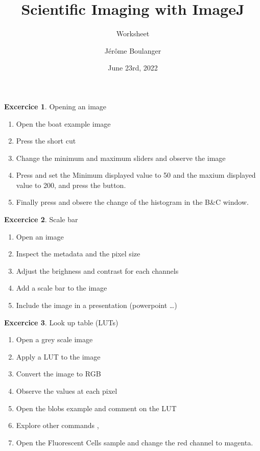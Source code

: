 \documentclass[xcolor=table]{article}
\title{Scientific Imaging with ImageJ}
\subtitle{Worksheet}
\author{J\'er\^ome Boulanger}
\date{June 23rd, 2022}
\theoremstyle{definition}
\newtheorem{exercice}{Excercice}
\begin{document}
\maketitle


\begin{exercice} Opening an image
\begin{enumerate}
  \item Open the boat example image 
  \item Press the short cut 
  \item Change the minimum and maximum sliders and observe the image
  \item Press  and set the Minimum displayed value to 50
    and the maxium displayed value to 200, and press the  button.
  \item Finally press  and obsere the change of the
    histogram in the B\&C window.
\end{enumerate}
\end{exercice}

\begin{exercice} Scale bar
\begin{enumerate}
  \item Open an image %
  \item Inspect the metadata  and the pixel size 
  \item Adjust the brighness and contrast for each channels
  \item Add a scale bar to the image
  \item Include the image in a presentation (powerpoint \dots)
\end{enumerate}
\end{exercice}

\begin{exercice} Look up table (LUTs)
\begin{enumerate}
  \item Open a grey scale image 
  \item Apply a LUT to the image 
  \item Convert the image to RGB 
  \item Observe the values at each pixel
  \item Open the blobs example  and
        comment on the LUT
  \item Explore other commands ,
  \item Open the Fluorescent Cells sample and change the red channel
        to magenta.
\end{enumerate}
\end{exercice}
\end{document}
